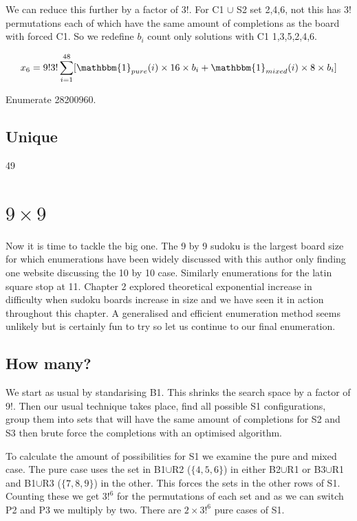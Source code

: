 \documentclass[a4paper,11pt]{report}
\newcounter{row}
\begin{document}
We can reduce this further by a factor of 3!. For C1 $\cup$ S2 set 2,4,6, not this has 3! permutations each of which have the same amount of completions as the board with forced C1. So we redefine $b_i$ count only solutions with C1 1,3,5,2,4,6.

\begin{equation}x_6=9!3!\sum^{48}_{i=1}[\mathbbm{1}_{pure}(i)\times16\times b_i+\mathbbm{1}_{mixed}(i)\times8\times b_i]\end{equation}

Enumerate
28200960.

\subsection{Unique}

49
	\section{$9 \times  9$}

Now it is time to tackle the big one. The 9 by 9 sudoku is the largest board size for which enumerations have been widely discussed with this author only finding one website discussing the 10 by 10 case. Similarly enumerations for the latin square stop at 11. Chapter 2 explored theoretical exponential increase in difficulty when sudoku boards increase in size and we have seen it in action throughout this chapter. A generalised and efficient enumeration method seems unlikely but is certainly fun to try so let us continue to our final enumeration.

\subsection{How many?}
We start as usual by standarising B1. This shrinks the search space by a factor of 9!. Then our usual technique takes place, find all possible S1 configurations, group them into sets that will have the same amount of completions for S2 and S3 then brute force the completions with an optimised algorithm.

To calculate the amount of possibilities for S1 we examine the pure and mixed case. The pure case uses the set  in B1$\cup$R2 ($\{4,5,6\}$) in either B2$\cup$R1 or B3$\cup$R1 and B1$\cup$R3 ($\{7,8,9\}$) in the other. This forces the sets in the other rows of S1. Counting these we get $3!^6$ for the permutations of each set and as we can switch P2 and P3 we multiply by two. There are $2\times 3!^6$ pure cases of S1. 
\end{document}
